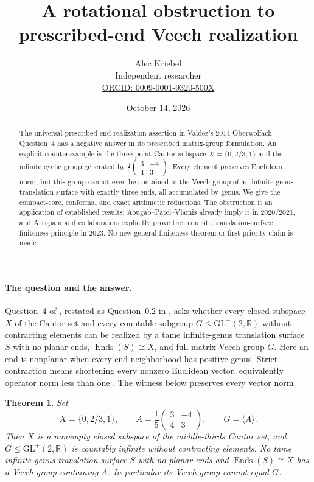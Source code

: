 \documentclass[11pt]{article}
\title{A rotational obstruction to prescribed-end Veech realization}
\author{Alec Kriebel\\\small Independent researcher\\\small\href{https://orcid.org/0009-0001-9320-500X}{ORCID: 0009-0001-9320-500X}}
\date{October 14, 2026}
\newtheorem{theorem}{Theorem}
\newcommand{\GL}{\mathrm{GL}^{+}(2,\mathbb R)}
\begin{document}
\maketitle
\begin{abstract}
The universal prescribed-end realization assertion in Valdez's 2014 Oberwolfach Question~4 has a negative answer in its prescribed matrix-group formulation. An explicit counterexample is the three-point Cantor subspace $X=\{0,2/3,1\}$ and the infinite cyclic group generated by $\frac15\left(\begin{smallmatrix}3&-4\\4&3\end{smallmatrix}\right)$. Every element preserves Euclidean norm, but this group cannot even be contained in the Veech group of an infinite-genus translation surface with exactly three ends, all accumulated by genus. We give the compact-core, conformal and exact arithmetic reductions. The obstruction is an application of established results: Aougab--Patel--Vlamis already imply it in 2020/2021, and Artigiani and collaborators explicitly prove the requisite translation-surface finiteness principle in 2023. No new general finiteness theorem or first-priority claim is made.
\end{abstract}

\paragraph{The question and the answer.}
Question~4 of \cite[p.~887]{OWR}, restated as Question~0.2 in \cite{RMV}, asks whether every closed subspace $X$ of the Cantor set and every countable subgroup $G\leq\GL$ without contracting elements can be realized by a tame infinite-genus translation surface $S$ with no planar ends, $\operatorname{Ends}(S)\cong X$, and full matrix Veech group $G$. Here an end is nonplanar when every end-neighborhood has positive genus. Strict contraction means shortening every nonzero Euclidean vector, equivalently operator norm less than one \cite[p.~674]{PSV}. The witness below preserves every vector norm.

\begin{theorem}\label{main}
Set
\[
 X=\{0,2/3,1\},\qquad A=\frac15\begin{pmatrix}3&-4\\4&3\end{pmatrix},\qquad G=\langle A\rangle.
\]
Then $X$ is a nonempty closed subspace of the middle-thirds Cantor set, and $G\leq\GL$ is countably infinite without contracting elements. No tame infinite-genus translation surface $S$ with no planar ends and $\operatorname{Ends}(S)\cong X$ has a Veech group containing $A$. In particular its Veech group cannot equal $G$.
\end{theorem}
\end{document}
